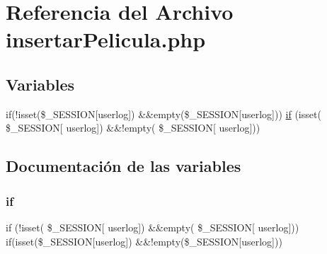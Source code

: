 \hypertarget{insertar_pelicula_8php}{}\section{Referencia del Archivo insertar\+Pelicula.\+php}
\label{insertar_pelicula_8php}
\subsection*{Variables}
\begin{DoxyCompactItemize}
\item 
if(!isset(\$\+\_\+\+S\+E\+S\+S\+I\+ON\mbox{[}\textquotesingle{}userlog\textquotesingle{}\mbox{]}) \&\&empty(\$\+\_\+\+S\+E\+S\+S\+I\+ON\mbox{[}\textquotesingle{}userlog\textquotesingle{}\mbox{]})) \mbox{\hyperlink{insertar_pelicula_8php_aa2baf0eb3a55cfb2103c03399175c1e4}{if}} (isset( \$\+\_\+\+S\+E\+S\+S\+I\+ON\mbox{[} \textquotesingle{}userlog\textquotesingle{}\mbox{]}) \&\&!empty( \$\+\_\+\+S\+E\+S\+S\+I\+ON\mbox{[} \textquotesingle{}userlog\textquotesingle{}\mbox{]}))
\end{DoxyCompactItemize}


\subsection{Documentación de las variables}
\mbox{\label{insertar_pelicula_8php_aa2baf0eb3a55cfb2103c03399175c1e4}} 
\subsubsection{\texorpdfstring{if}{if}}
{\footnotesize\ttfamily if (!isset( \$\+\_\+\+S\+E\+S\+S\+I\+ON\mbox{[} \textquotesingle{}userlog\textquotesingle{}\mbox{]}) \&\&empty( \$\+\_\+\+S\+E\+S\+S\+I\+ON\mbox{[} \textquotesingle{}userlog\textquotesingle{}\mbox{]})) if(isset(\$\+\_\+\+S\+E\+S\+S\+I\+ON\mbox{[}\textquotesingle{}userlog\textquotesingle{}\mbox{]}) \&\&!empty(\$\+\_\+\+S\+E\+S\+S\+I\+ON\mbox{[}\textquotesingle{}userlog\textquotesingle{}\mbox{]}))}

